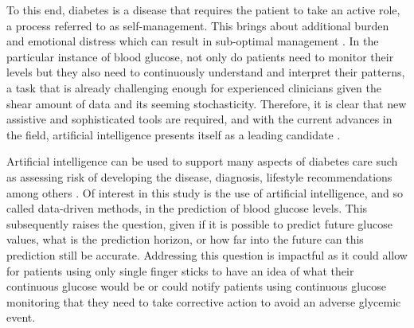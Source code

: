 
To this end, diabetes is a disease that requires the patient to take an active role, a process referred to as self-management. This brings about additional burden and emotional distress which can result in sub-optimal management \cite{adu_enablers_2019}. In the particular instance of blood glucose, not only do patients need to monitor their levels but they also need to continuously understand and interpret their patterns, a task that is already challenging enough for experienced clinicians given the shear amount of data and its seeming stochasticity. Therefore, it is clear that new assistive and sophisticated tools are required, and with the current advances in the field, artificial intelligence presents itself as a leading candidate \cite{mayya_need_2024}.

Artificial intelligence can be used to support many aspects of diabetes care such as assessing risk of developing the disease, diagnosis, lifestyle recommendations among others \cite{mayya_need_2024}. Of interest in this study is the use of artificial intelligence, and so called data-driven methods, in the prediction of blood glucose levels. This subsequently raises the question, given if it is possible to predict future glucose values, what is the prediction horizon, or how far into the future can this prediction still be accurate. Addressing this question is impactful as it could allow for patients using only single finger sticks to have an idea of what their continuous glucose would be or could notify patients using continuous glucose monitoring that they need to take corrective action to avoid an adverse glycemic event.











